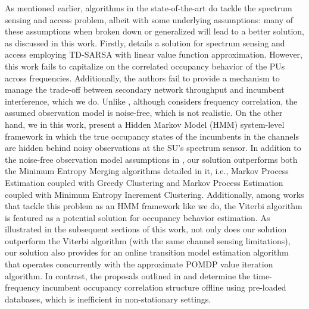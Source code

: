 \documentclass[12pt, draftcls, onecolumn]{IEEEtran}
\begin{document}
 As mentioned earlier, algorithms in the state-of-the-art do tackle the spectrum sensing and access problem, albeit with some underlying assumptions: many of these assumptions when broken down or generalized will lead to a better solution, as discussed in this work. Firstly, \cite{WCL:5} details a solution for spectrum sensing and access employing TD-SARSA with linear value function approximation. However, this work fails to capitalize on the correlated occupancy behavior of the PUs across frequencies. Additionally, the authors fail to provide a mechanism to manage the trade-off between secondary network throughput and incumbent interference, which we do. Unlike \cite{WCL:5}, although \cite{WCL:7} considers frequency correlation, the assumed observation model is noise-free, which is not realistic. On the other hand, we in this work, present a Hidden Markov Model (HMM) system-level framework in which the true occupancy states of the incumbents in the channels are hidden behind noisy observations at the SU's spectrum sensor. In addition to the noise-free observation model assumptions in \cite{WCL:7}, our solution outperforms both the Minimum Entropy Merging algorithms detailed in it, i.e., Markov Process Estimation coupled with Greedy Clustering and Markov Process Estimation coupled with Minimum Entropy Increment Clustering. Additionally, among works that tackle this problem as an HMM framework \cite{WCL:6} like we do, the Viterbi algorithm is featured as a potential solution for occupancy behavior estimation. As illustrated in the subsequent sections of this work, not only does our solution outperform the Viterbi algorithm (with the same channel sensing limitations), our solution also provides for an online transition model estimation algorithm that operates concurrently with the approximate POMDP value iteration algorithm. In contrast, the proposals outlined in \cite{WCL:6} and \cite{WCL:7} determine the time-frequency incumbent occupancy correlation structure offline using pre-loaded databases, which is inefficient in non-stationary settings.
\end{document}
